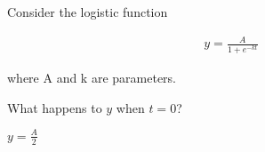 Consider the logistic function 

\begin{align*}
    y = \frac{A}{1 + e^{-kt}}
\end{align*}

where A and k are parameters.

What happens to $y$ when $t = 0$?

\begin{solution}
    $y = \frac{A}{2}$
\end{solution}